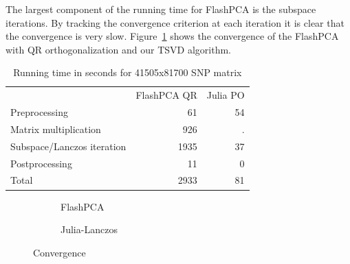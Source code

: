 \documentclass[review]{siamart0516}
\begin{document}
The largest component of the running time for FlashPCA is the subspace iterations. By tracking the convergence criterion at each iteration it is clear that the convergence is very slow. Figure~\ref{fig:conv} shows the convergence of the FlashPCA with QR orthogonalization and our TSVD algorithm.

\begin{table}
    \caption{Running time in seconds for 41505x81700 SNP matrix}
    \centering
    \begin{tabular}{lrr}
                                   & FlashPCA QR & Julia PO \\
        Preprocessing              &   61        & 54            \\
        Matrix multiplication      &  926        & .             \\
        Subspace/Lanczos iteration & 1935        & 37            \\
        Postprocessing             &   11        & 0             \\
        Total                      & 2933        & 81
    \end{tabular}
\end{table}

\begin{figure}
    \centering
    \begin{subfigure}{0.72\textwidth}
        \caption{FlashPCA}
    \end{subfigure}
    \begin{subfigure}{0.23\textwidth}
        \caption{Julia-Lanczos}
    \end{subfigure}
    \caption{Convergence}
    \label{fig:conv}
\end{figure}
\end{document}
